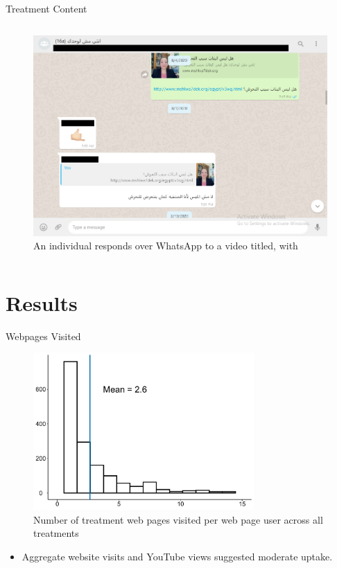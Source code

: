 \documentclass[10pt]{beamer}
\begin{document}
\begin{frame}{Treatment Content}
\begin{columns}[T]
\begin{column}{0.5\textwidth}
\begin{figure} \includegraphics[width = 1\textwidth]{Recruit_Intervention/30.png}\captionsetup{font=small}
\caption{An individual responds over WhatsApp to a video titled,  with } 
 \end{figure} 
\end{column}
\end{columns}
\end{frame}

\section{Results}

\begin{frame}{Webpages Visited}
\begin{figure}[H]
    \centering
    \includegraphics[height=6cm,width=8cm\linewidth]{Figures/Other/pages_all.pdf} 
    \caption{\scriptsize Number of treatment web pages visited per web page user across all treatments} 
\end{figure}
\begin{itemize}
    \item Aggregate website visits and YouTube views suggested moderate uptake. 
\end{itemize}
\end{frame}
\end{document}
